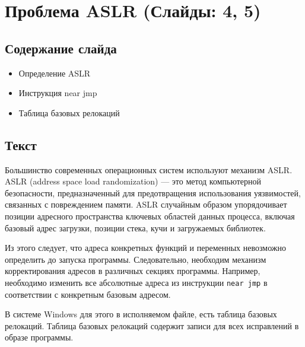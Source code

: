 
\section{Проблема ASLR (Слайды: 4, 5)}

\subsection{Содержание слайда}

\begin{itemize}
  \item Определение ASLR
  \item Инструкция near jmp
  \item Таблица базовых релокаций
\end{itemize}

\subsection{Текст}

Большинство современных операционных систем используют механизм ASLR. ASLR
(address space load randomization) --- это метод компьютерной безопасности,
предназначенный для предотвращения использования уязвимостей, связанных с
повреждением памяти. ASLR случайным образом упорядочивает позиции адресного
пространства ключевых областей данных процесса, включая базовый адрес загрузки,
позиции стека, кучи и загружаемых библиотек.

Из этого следует, что адреса конкретных функций и переменных невозможно
определить до запуска программы. Следовательно, необходим механизм
корректирования адресов в различных секциях программы. Например, необходимо
изменить все абсолютные адреса из инструкции \verb!near jmp! в соответствии с
конкретным базовым адресом.

В системе Windows для этого в исполняемом файле, есть таблица базовых
релокаций. Таблица базовых релокаций содержит записи для всех исправлений в
образе программы. 
